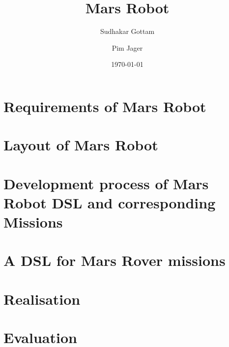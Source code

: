 \documentclass[titlepage]{article}
\author{%
	Sudhakar Gottam\and
	Pim Jager
}
\title{Mars Robot}
\date{\today}
\begin{document}
\maketitle
\tableofcontents
\newpage

\section{Requirements of Mars Robot} \label{sec:requirements}
 

\section{Layout of Mars Robot} \label{sec:layout}


\section{Development process of Mars Robot DSL and corresponding Missions}
\label{sec:process}


\section{A DSL for Mars Rover missions}


\section{Realisation}


\section{Evaluation}

\end{document}

